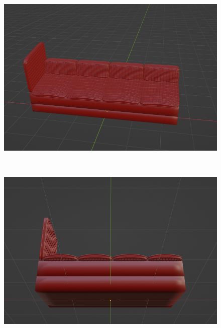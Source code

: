 \begin{figure}[h]
\begin{minipage}[b]{0.48\linewidth}
 \end{minipage}
 \begin{minipage}[b]{0.48\linewidth}
  \centering
  \includegraphics[scale=0.17]{./imgs/sofaParamMean/widthMax.png}
 \end{minipage}\\
 \begin{minipage}[b]{0.48\linewidth}
  \centering
  \includegraphics[scale=0.17]{./imgs/sofaParamMean/legHeightMin.png}
 \end{minipage}
 \begin{minipage}[b]{0.48\linewidth}
  \centering

\end{minipage}
\end{figure}
